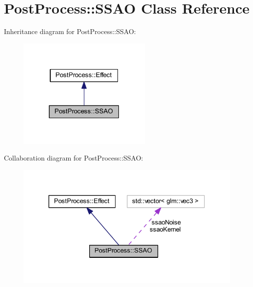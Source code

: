 \hypertarget{class_post_process_1_1_s_s_a_o}{}\section{Post\+Process\+:\+:S\+S\+AO Class Reference}
\label{class_post_process_1_1_s_s_a_o}


Inheritance diagram for Post\+Process\+:\+:S\+S\+AO\+:
\nopagebreak
\begin{figure}[H]
\begin{center}
\leavevmode
\includegraphics[width=187pt]{class_post_process_1_1_s_s_a_o__inherit__graph}
\end{center}
\end{figure}


Collaboration diagram for Post\+Process\+:\+:S\+S\+AO\+:
\nopagebreak
\begin{figure}[H]
\begin{center}
\leavevmode
\includegraphics[width=324pt]{class_post_process_1_1_s_s_a_o__coll__graph}
\end{center}
\end{figure}
